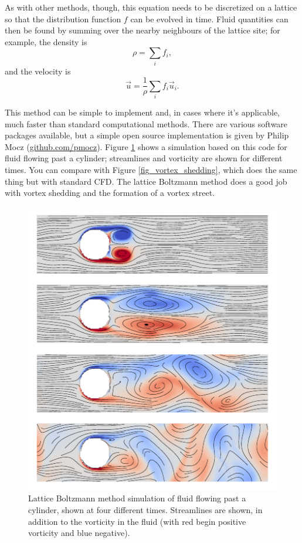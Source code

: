 As with other methods, though, this equation needs to be discretized on a lattice so that the distribution function $f$ can be evolved in time.  Fluid quantities can then be found by summing over the nearby neighbours of the lattice site; for example, the density is
\[
\rho = \sum_i f_i,
\]
and the velocity is
\[
\vec{u} = \frac{1}{\rho} \sum_i f_i \vec{u}_i.
\]

This method can be simple to implement and, in cases where it's applicable, much faster than standard computational methods.  There are various software packages available, but a simple open source implementation is given by Philip Mocz (\href{https://github.com/pmocz/latticeboltzmann-python}{github.com/pmocz}).  Figure \ref{fig_lbm} shows a simulation based on this code for fluid flowing past a cylinder; streamlines and vorticity are shown for different times.  You can compare with Figure \ref{fig_vortex_shedding}, which does the same thing but with standard CFD.  The lattice Boltzmann method does a good job with vortex shedding and the formation of a vortex street.

\begin{figure}
\centering
\includegraphics[width=0.8\linewidth]{Figures/Chapter6/fig_lbm}
\caption{Lattice Boltzmann method simulation of fluid flowing past a cylinder, shown at four different times.  Streamlines are shown, in addition to the vorticity in the fluid (with red begin positive vorticity and blue negative).}
\label{fig_lbm}
\end{figure}

